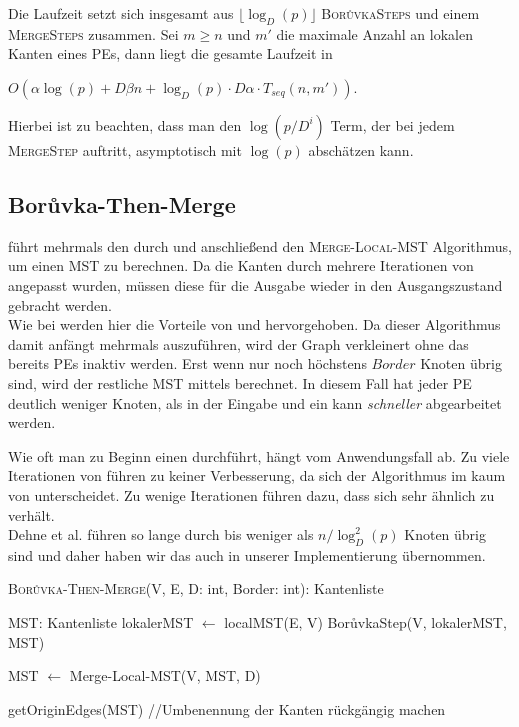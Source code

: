Die Laufzeit setzt sich insgesamt aus $\lfloor \log_{D}(p) \rfloor$  \textsc{Bor{\r u}vkaSteps} und einem \textsc{MergeSteps} zusammen. Sei $m \geq n$ und $m'$ die maximale Anzahl an lokalen Kanten eines PEs, dann liegt die gesamte Laufzeit in 
\begin{center}
$O(\alpha \log(p) + D\beta n + \log_D(p) \cdot D\alpha \cdot T_{seq}(n,m'))$.
\end{center} 
Hierbei ist zu beachten, dass man den $\log(p/D^i)$ Term, der bei jedem \textsc{MergeStep} auftritt, asymptotisch mit $\log(p)$ abschätzen kann.


\subsection{Bor{\r u}vka-Then-Merge}
\boruvkaThenMerge führt mehrmals den \boruvkaStep durch und anschließend den \textsc{Merge-Local-MST} Algorithmus, um einen MST zu berechnen. Da die Kanten durch mehrere Iterationen von \boruvkaAllreduce angepasst wurden, müssen diese für die Ausgabe wieder in den Ausgangszustand gebracht werden. \\
Wie bei \boruvkaMixedMerge werden hier die Vorteile von \boruvkaAllreduce und \mergeMST hervorgehoben.
Da dieser Algorithmus damit anfängt mehrmals \boruvkaStep auszuführen, wird der Graph verkleinert ohne das bereits PEs inaktiv werden. Erst wenn nur noch höchstens $Border$ Knoten übrig sind, wird der restliche MST mittels \mergeMST berechnet. In diesem Fall hat jeder PE deutlich weniger Knoten, als in der Eingabe und ein \mergeStep kann \emph{schneller} abgearbeitet werden.

Wie oft man zu Beginn einen \boruvkaStep durchführt, hängt vom Anwendungsfall ab. Zu viele Iterationen von \boruvkaAllreduce führen zu keiner Verbesserung, da sich der Algorithmus im kaum von \boruvkaAllreduce unterscheidet. Zu wenige Iterationen führen dazu, dass sich \boruvkaThenMerge sehr ähnlich zu \mergeMST verhält.\\
Dehne et al. \cite{dehne1998practical} führen \boruvka so lange durch bis weniger als $n/\log_{D}^2(p)$ Knoten übrig sind und daher haben wir das auch in unserer Implementierung übernommen.



\begin{algorithm} 
\caption{\textsc{Bor{\r u}vka-Then-Merge}(V, E, D: int, Border: int): Kantenliste}
\begin{algorithmic}[1]
\label{Boruvka-Then-Merge-Algo}

\STATE MST: Kantenliste
\STATE lokalerMST $\gets$ localMST(E, V)
    \STATE Bor{\r u}vkaStep(V, lokalerMST, MST)
\ENDWHILE

\STATE MST $\gets$ Merge-Local-MST(V, MST, D)

\RETURN getOriginEdges(MST) //Umbenennung der Kanten rückgängig machen
\end{algorithmic}
\end{algorithm}





